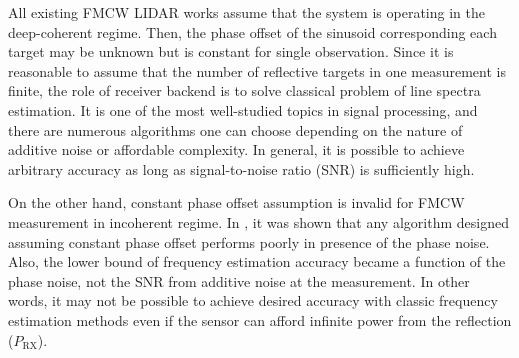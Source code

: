 \documentclass{article}
\begin{document}
All existing FMCW LIDAR works assume that the system is operating in the deep-coherent regime. Then, the phase offset of the sinusoid corresponding each target may be unknown but is constant for single observation. Since it is reasonable to assume that the number of reflective targets in one measurement is finite, the role of receiver backend is to solve classical problem of line spectra estimation. It is one of the most well-studied topics in signal processing, and there are numerous algorithms one can choose depending on the nature of additive noise or affordable complexity. In general, it is possible to achieve arbitrary accuracy as long as signal-to-noise ratio (SNR) is sufficiently high.


On the other hand, constant phase offset assumption is invalid for FMCW measurement in incoherent regime. In \cite{C2}, it was shown that any algorithm designed assuming constant phase offset performs poorly in presence of the phase noise. Also, the lower bound of frequency estimation accuracy became a function of the phase noise, not the SNR from additive noise at the measurement. In other words, it may not be possible to achieve desired accuracy with classic frequency estimation methods even if the sensor can afford infinite power from the reflection ($P_\text{RX}$).

\end{document}

